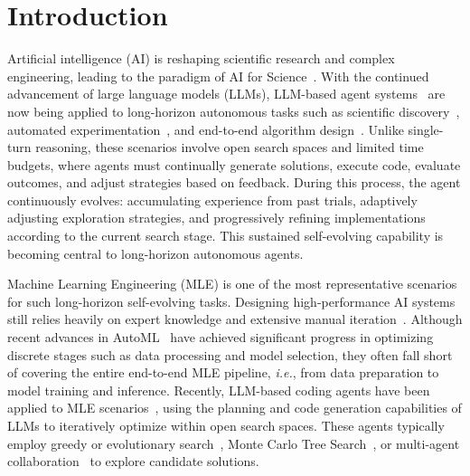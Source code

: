 
\section{Introduction}


Artificial intelligence (AI) is reshaping scientific research and complex engineering, leading to the paradigm of AI for Science~\citep{van2023ai4Science}. With the continued advancement of large language models (LLMs), LLM-based agent systems~\citep{du2026survey} are now being applied to long-horizon autonomous tasks such as scientific discovery~\citep{aiscientist,team2025novelseek}, automated experimentation~\citep{feng2026internagent}, and end-to-end algorithm design~\citep{novikov2025alphaevolve}. Unlike single-turn reasoning, these scenarios involve open search spaces and limited time budgets, where agents must continually generate solutions, execute code, evaluate outcomes, and adjust strategies based on feedback. During this process, the agent continuously evolves: accumulating experience from past trials, adaptively adjusting exploration strategies, and progressively refining implementations according to the current search stage. This sustained self-evolving capability is becoming central to long-horizon autonomous agents.


Machine Learning Engineering (MLE) is one of the most representative scenarios for such long-horizon self-evolving tasks. Designing high-performance AI systems still relies heavily on expert knowledge and extensive manual iteration~\citep{amershi2019software-mle}. Although recent advances in AutoML~\citep{he2021automl,feurer2022auto-sklearn} have achieved significant progress in optimizing discrete stages such as data processing and model selection, they often fall short of covering the entire end-to-end MLE pipeline, \textit{i.e.}, from data preparation to model training and inference.
Recently, LLM-based coding agents have been applied to MLE scenarios~\citep{wang2024openhands,mlab,aide,rdagent,ml-master}, using the planning and code generation capabilities of LLMs to iteratively optimize within open search spaces. These agents typically employ greedy or evolutionary search~\citep{aide,li2025fm}, Monte Carlo Tree Search~\citep{ml-master,dojo}, or multi-agent collaboration~\citep{rdagent} to explore candidate solutions.

